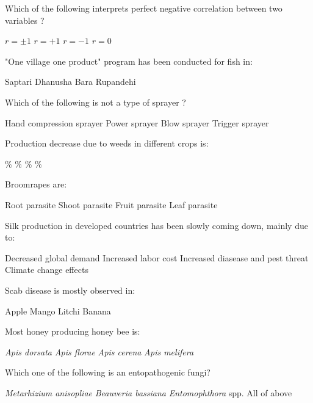 \begin{questions}
\question Which of the following interprets perfect negative correlation between two variables ?
  \begin{choices}
  \choice $r = \pm 1$
  \choice $r = + 1$
  \choice $r = - 1$
  \choice $r = 0$
  \end{choices}

\question "One village one product" program has been conducted for fish in:
  \begin{choices}
  \choice Saptari
  \choice Dhanusha
  \choice Bara
  \choice Rupandehi
  \end{choices}

\question Which of the following is not a type of sprayer ?
  \begin{choices}
  \choice Hand compression sprayer
  \choice Power sprayer
  \choice Blow sprayer
  \choice Trigger sprayer
  \end{choices}

\question Production decrease due to weeds in different crops is: 
  \begin{choices}
  \%
  \%
  \%
  \%
  \end{choices}

\question Broomrapes are:
  \begin{choices}
  \choice Root parasite
  \choice Shoot parasite
  \choice Fruit parasite
  \choice Leaf parasite
  \end{choices}

\question Silk production in developed countries has been slowly coming down, mainly due to:
  \begin{choices}
  \choice Decreased global demand
  \choice Increased labor cost
  \choice Increased diasease and pest threat
  \choice Climate change effects
  \end{choices}

\question Scab disease is mostly observed in:
  \begin{choices}
  \choice Apple
  \choice Mango
  \choice Litchi
  \choice Banana
  \end{choices}

\question Most honey producing honey bee is:
  \begin{choices}
  \choice \textit{Apis dorsata}
  \choice \textit{Apis florae}
  \choice \textit{Apis cerena}
  \choice \textit{Apis melifera}
  \end{choices}

\question Which one of the following is an entopathogenic fungi?
  \begin{choices}
  \choice \textit{Metarhizium anisopliae}
  \choice \textit{Beauveria bassiana}
  \choice \textit{Entomophthora} spp.
  \choice All of above
  \end{choices}


\end{questions}
